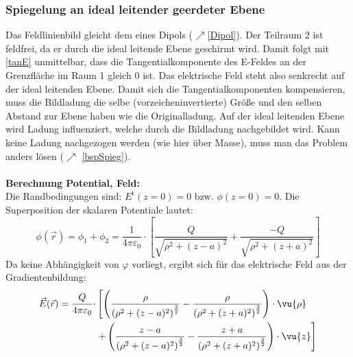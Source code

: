 	  \subsubsection{Spiegelung an ideal leitender geerdeter Ebene}
		  \begin{minipage}[t]{0.5\textwidth}
			  \resizebox{!}{4cm}{}
		  \end{minipage}
		  \begin{minipage}[t]{0.5\textwidth}
			  \raggedright
			  \resizebox{!}{4cm}{}
		  \end{minipage}
		  Das Feldlinienbild gleicht dem eines Dipols ($\nearrow$\ref{Dipol}). Der Teilraum {2} ist feldfrei, da er durch die ideal leitende Ebene geschirmt wird. Damit folgt mit \ref{tanE} unmittelbar, dass die Tangentialkomponente des E-Feldes an der Grenzfläche im Raum 1 gleich 0 ist. Das elektrische Feld steht also senkrecht auf der ideal leitenden Ebene. Damit sich die Tangentialkomponenten kompensieren, muss die Bildladung die selbe (vorzeicheninvertierte) Größe und den selben Abstand zur Ebene haben wie die Originalladung. Auf der ideal leitenden Ebene wird Ladung influenziert, welche durch die Bildladung nachgebildet wird. Kann keine Ladung nachgezogen werden (wie hier über Masse), muss man das Problem anders lösen ($\nearrow$ \ref{bspSpieg}). \\\\
	  \textbf{Berechnung Potential, Feld:}\\
			  Die  Randbedingungen sind: \(E^\text{t}(z=0) = 0\) bzw. \(\phi(z=0) = 0\).
			Die Superposition der skalaren Potentiale lautet:
			        \begin{equation}\label{potSpiegEben}
				        \phi(\vec{r} ) = \phi_1 + \phi_2
				        = \frac{1}{4\pi\varepsilon_0} \cdot \left[ \dfrac{ Q}{\sqrt{\rho^2 + (z - a)^2}} + \dfrac{- Q}{\sqrt{\rho^2 + (z + a)^2}} \right]
			        \end{equation}
			         Da keine Abhängigkeit von \(\varphi\) vorliegt, ergibt sich für das elektrische Feld aus der Gradientenbildung:
			        \begin{equation}
				        \begin{split}
					        \vec{E}(\vec{r} ) = \frac{Q}{4\pi\varepsilon_0} \cdot
					        &\left[ \left( \dfrac{\rho}{\left( \rho^2 + (z - a)^2 \right)^{\frac{3}{2}}} - \dfrac{\rho}{\left( \rho^2 + (z + a)^2 \right)^{\frac{3}{2}}} \right) \cdot \vu{\rho} \right. \\
						        &	 \left. + \left( \dfrac{z - a}{\left( \rho^2 + (z - a)^2 \right)^{\frac{3}{2}}} - \dfrac{z + a}{\left( \rho^2 + (z + a)^2 \right)^{\frac{3}{2}}} \right) \cdot \vu{z} \right]
				        \end{split}
			        \end{equation}
